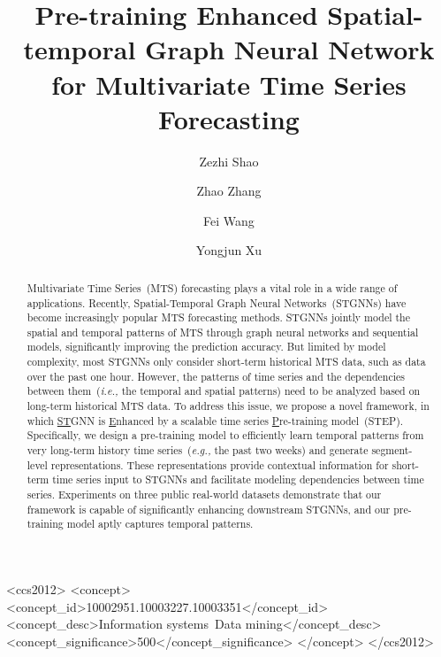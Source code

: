 \documentclass[sigconf]{acmart}
\newcommand{\eg}{\textit{e.g.,}\xspace}
\newcommand{\ie}{\textit{i.e.,}\xspace}
\begin{document}
\title{Pre-training Enhanced Spatial-temporal Graph Neural Network for Multivariate Time Series Forecasting}



\author{Zezhi Shao}

\author{Zhao Zhang}

\author{Fei Wang}

\author{Yongjun Xu}

\renewcommand{\shortauthors}{Zezhi Shao et al.}
\renewcommand{\authors}{Zezhi Shao, Zhao Zhang, Fei Wang, Yongjun Xu}


\begin{abstract}  
Multivariate Time Series~(MTS) forecasting plays a vital role in a wide range of applications.
Recently, Spatial-Temporal Graph Neural Networks~(STGNNs) have become increasingly popular MTS forecasting methods.
STGNNs jointly model the spatial and temporal patterns of MTS through graph neural networks and sequential models, significantly improving the prediction accuracy.
But limited by model complexity, most STGNNs only consider short-term historical MTS data, such as data over the past one hour.
However, the patterns of time series and the dependencies between them~(\ie the temporal and spatial patterns) need to be analyzed based on long-term historical MTS data.
To address this issue, we propose a novel framework, in which
\underline{S}\underline{T}GNN is \underline{E}nhanced by a scalable time series \underline{P}re-training model~(STEP).
Specifically, we design a pre-training model to efficiently learn temporal patterns from very long-term history time series~(\eg the past two weeks) and generate segment-level representations.
These representations provide contextual information for short-term time series input to STGNNs and facilitate modeling dependencies between time series.
Experiments on three public real-world datasets demonstrate that our framework is capable of significantly enhancing downstream STGNNs, and our pre-training model aptly captures temporal patterns.
\end{abstract} 
\begin{CCSXML}
<ccs2012>
   <concept>
       <concept_id>10002951.10003227.10003351</concept_id>
       <concept_desc>Information systems~Data mining</concept_desc>
       <concept_significance>500</concept_significance>
       </concept>
 </ccs2012>
\end{CCSXML}
\end{document}
